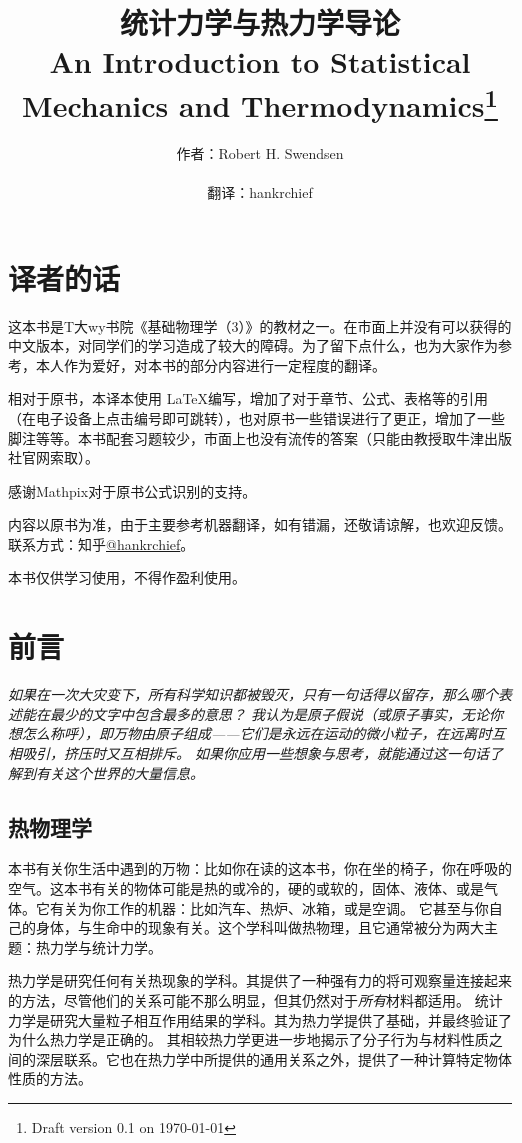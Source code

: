 \documentclass[UTF8]{ctexart}
\title{统计力学与热力学导论\\An Introduction to Statistical Mechanics and Thermodynamics\thanks{Draft version 0.1 on \today}}
\author{作者：Robert H. Swendsen\\ \\ 翻译：hankrchief}
\numberwithin{equation}{section}%
\numberwithin{figure}{section}%
\begin{document}
\maketitle
\clearpage
\tableofcontents
\clearpage
    \setcounter{section}{-1}
    \section{译者的话}
    \label{chap0}

    这本书是T大wy书院《基础物理学（3）》的教材之一。在市面上并没有可以获得的中文版本，对同学们的学习造成了较大的障碍。为了留下点什么，也为大家作为参考，本人作为爱好，对本书的部分内容进行一定程度的翻译。

    相对于原书，本译本使用 \LaTeX 编写，增加了对于章节、公式、表格等的引用（在电子设备上点击编号即可跳转），也对原书一些错误进行了更正，增加了一些脚注等等。本书配套习题较少，市面上也没有流传的答案（只能由教授取牛津出版社官网索取）。

    感谢Mathpix对于原书公式识别的支持。
    
    内容以原书为准，由于主要参考机器翻译，如有错漏，还敬请谅解，也欢迎反馈。联系方式：知乎\href{https://www.zhihu.com/people/hankrchief/posts}{@hankrchief}。
    
    本书仅供学习使用，不得作盈利使用。
    \clearpage
    \section{前言}
    \label{chap1}

    \textit{如果在一次大灾变下，所有科学知识都被毁灭，只有一句话得以留存，那么哪个表述能在最少的文字中包含最多的意思？
    我认为是原子假说（或原子事实，无论你想怎么称呼），即万物由原子组成——它们是永远在运动的微小粒子，在远离时互相吸引，挤压时又互相排斥。
    如果你应用一些想象与思考，就能通过这一句话了解到有关这个世界的大量信息。
    \\}
    
    \subsection{热物理学}
    本书有关你生活中遇到的万物：比如你在读的这本书，你在坐的椅子，你在呼吸的空气。这本书有关的物体可能是热的或冷的，硬的或软的，固体、液体、或是气体。它有关为你工作的机器：比如汽车、热炉、冰箱，或是空调。
    它甚至与你自己的身体，与生命中的现象有关。这个学科叫做热物理，且它通常被分为两大主题：热力学与统计力学。
    
    热力学是研究任何有关热现象的学科。其提供了一种强有力的将可观察量连接起来的方法，尽管他们的关系可能不那么明显，但其仍然对于\textit{所有}材料都适用。
    统计力学是研究大量粒子相互作用结果的学科。其为热力学提供了基础，并最终验证了为什么热力学是正确的。
    其相较热力学更进一步地揭示了分子行为与材料性质之间的深层联系。它也在热力学中所提供的通用关系之外，提供了一种计算特定物体性质的方法。
\end{document}

